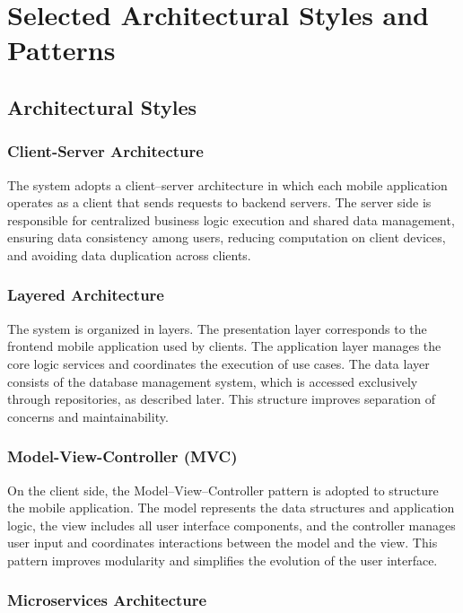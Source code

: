 \section{Selected Architectural Styles and Patterns}
\label{sec:architectural_styles_patterns}%

\subsection{Architectural Styles}

\subsubsection{Client-Server Architecture}

The system adopts a client--server architecture in which each mobile application operates as a client that sends requests to backend servers. The server side is responsible for centralized business logic execution and shared data management, ensuring data consistency among users, reducing computation on client devices, and avoiding data duplication across clients.

\subsubsection{Layered Architecture}

The system is organized in layers. The presentation layer corresponds to the frontend mobile application used by clients. The application layer manages the core logic services and coordinates the execution of use cases. The data layer consists of the database management system, which is accessed exclusively through repositories, as described later. This structure improves separation of concerns and maintainability.

\subsubsection{Model-View-Controller (MVC)}

On the client side, the Model–View–Controller pattern is adopted to structure the mobile application. The model represents the data structures and application logic, the view includes all user interface components, and the controller manages user input and coordinates interactions between the model and the view. This pattern improves modularity and simplifies the evolution of the user interface.

\subsubsection{Microservices Architecture}

